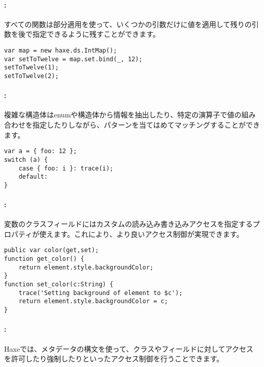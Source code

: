 \paragraph{:} 

すべての関数は部分適用を使って、いくつかの引数だけに値を適用して残りの引数を後で指定できるように残すことができます。

\begin{lstlisting}
var map = new haxe.ds.IntMap();
var setToTwelve = map.set.bind(_, 12);
setToTwelve(1);
setToTwelve(2);
\end{lstlisting}

\paragraph{:} 

複雑な構造体はenumや構造体から情報を抽出したり、特定の演算子で値の組み合わせを指定したりしながら、パターンを当てはめてマッチングすることができます。

\begin{lstlisting}
var a = { foo: 12 };
switch (a) {
    case { foo: i }: trace(i);
    default:
}
\end{lstlisting}

\paragraph{:}

変数のクラスフィールドにはカスタムの読み込み書き込みアクセスを指定するプロパティが使えます。これにより、より良いアクセス制御が実現できます。

\begin{lstlisting}
public var color(get,set);
function get_color() {
    return element.style.backgroundColor;
}
function set_color(c:String) {
    trace('Setting background of element to $c');
    return element.style.backgroundColor = c;
}
\end{lstlisting}

\paragraph{:}

Haxeでは、メタデータの構文を使って、クラスやフィールドに対してアクセスを許可したり強制したりといったアクセス制御を行うことできます。

